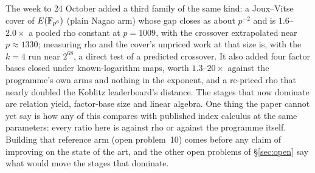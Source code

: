 The week to 24 October added a third family of the same kind: a
Joux--Vitse cover of $E(\mathbb{F}_{p^6})$ (plain Nagao arm) whose gap closes as about $p^{-2}$ and
is $1.6$--$2.0\times$ a pooled rho constant at $p=1009$, with the crossover
extrapolated near $p\approx1330$; measuring rho and the cover's unpriced
work at that size is, with the $k=4$ run near $2^{68}$, a direct test of a
predicted crossover.
It also added four factor bases closed under known-logarithm maps, worth
$1.3$--$20\times$ against the programme's own arms and nothing in the
exponent, and a re-priced rho that nearly doubled the Koblitz leaderboard's
distance. The stages that now dominate are relation yield, factor-base size
and linear algebra. One thing the paper cannot yet say is how any of this
compares with published index calculus at the same parameters: every ratio
here is against rho or against the programme itself. Building that
reference arm (open problem~10) comes before any claim of improving on the
state of the art, and the other open problems of \S\ref{sec:open} say what
would move the stages that dominate.
